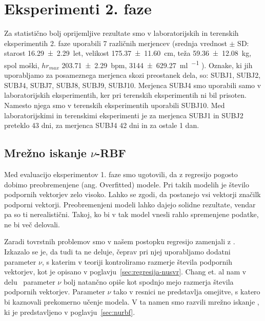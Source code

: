 \section{Eksperimenti 2. faze}

Za statistično bolj oprijemljive rezultate smo v laboratorijskih in terenskih eksperimentih 2. faze uporabili 7 različnih merjencev  (srednja vrednost $\pm$ SD: starost \SI{16.29 \pm 2.29}{let}, velikost \SI{175.37 \pm 11.60}{\cm}, teža \SI{59.36 \pm 12.08}{\kg}, spol moški, $hr_{max}$ \SI{203.71 \pm 2.29}{bpm}, \vomax \SI{3144 \pm 629.27}{\ml\per\min} ). Oznake, ki jih uporabljamo za posameznega merjenca skozi preostanek dela, so: SUBJ1, SUBJ2, SUBJ4, SUBJ7, SUBJ8, SUBJ9, SUBJ10. Merjenca SUBJ4 smo uporabili samo v laboratorijskih eksperimentih, ker pri terenskih eksperimentih ni bil prisoten. Namesto njega smo v terenskih eksperimentih uporabili SUBJ10. Med laboratorijskimi in terenskimi eksperimenti je za merjenca SUBJ1 in SUBJ2 preteklo 43 dni, za merjenca SUBJ4 42 dni in za ostale 1 dan.  

\subsection{Mrežno iskanje \texorpdfstring{$\nu$}{nu}-RBF}
Med evaluacijo eksperimentov 1. faze smo ugotovili, da z regresijo \esvr pogosto dobimo preobremenjene (ang. Overfitted) modele. Pri takih modelih je število podpornih vektorjev zelo visoko. Lahko se zgodi, da postanejo vsi vektorji značilk podporni vektorji. Preobremenjeni modeli lahko dajejo solidne rezultate, vendar pa so ti nerealistični. Takoj, ko bi v tak model vnesli rahlo spremenjene podatke, ne bi več delovali.

Zaradi tovrstnih problemov smo v našem postopku regresijo \esvr zamenjali z \nusvr. Izkazalo se je, da tudi ta ne deluje, čeprav pri njej uporabljamo dodatni parameter $\nu$, s katerim v teoriji kontroliramo razmerje števila podpornih vektorjev, kot je opisano v poglavju~\ref{sec:regresija-nusvr}. Chang et. al nam v delu~\cite{chang2002training} parameter $\nu$ bolj natančno opiše kot spodnjo mejo razmerja števila podpornih vektorjev. Parameter $\nu$ tako v resnici ne predstavlja omejitve, s katero bi kaznovali prekomerno učenje modela. V ta namen smo razvili mrežno iskanje \nurbf, ki je predstavljeno v poglavju~\ref{sec:nurbf}. 

